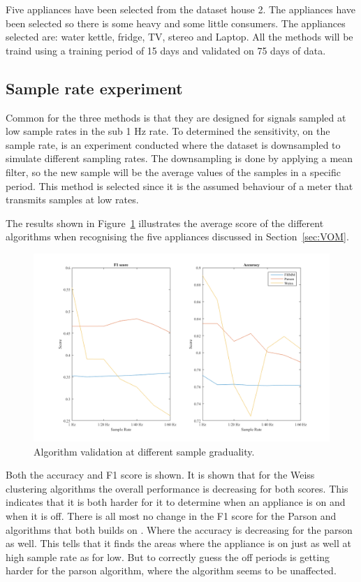Five appliances have been selected from the  dataset house 2. The appliances have been selected so there is some heavy and some little consumers. The appliances selected are: water kettle, fridge, TV, stereo and Laptop. All the methods will be traind using a training period of 15 days and validated on 75 days of data. 

\subsection{Sample rate experiment}
Common for the three methods is that they are designed for signals sampled at low sample rates in the sub 1 Hz rate. To determined the sensitivity, on the sample rate, is an experiment conducted where the dataset is downsampled to simulate different sampling rates. The downsampling is done by applying a mean filter, so the new sample will be the average values of the samples in a specific period. This method is selected since it is the assumed behaviour of a meter that transmits samples at low rates. 

The results shown in Figure~\ref{fig:DSE} illustrates the average score of the different algorithms when recognising the five appliances discussed in Section~\ref{sec:VOM}. 

\begin{figure}[H]
\centering
\includegraphics[width=1\textwidth]{billeder/AlgoScoreNilm.png}
\caption{Algorithm validation at different sample graduality.}
\label{fig:DSE}
\end{figure}

Both the accuracy and F1 score is shown. It is shown that for the Weiss clustering algorithms the overall performance is decreasing for both scores. This indicates that it is both harder for it to determine when an appliance is on and when it is off. There is all most no change in the F1 score for the Parson and  algorithms that both builds on . Where the accuracy is decreasing for the parson as well. This tells that it finds the areas where the appliance is on just as well at high sample rate as for low. But to correctly guess the off periods is getting harder for the parson algorithm, where the  algorithm seems to be unaffected. 

